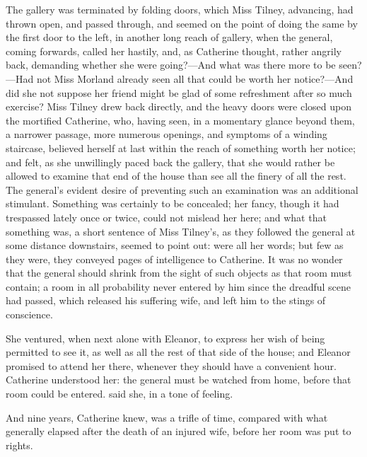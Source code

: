 The gallery was terminated by folding doors, which Miss Tilney, advancing, had thrown open, and passed through, and seemed on the point of doing the same by the first door to the left, in another long reach of gallery, when the general, coming forwards, called her hastily, and, as Catherine thought, rather angrily back, demanding whether she were going?---And what was there more to be seen?---Had not Miss Morland already seen all that could be worth her notice?---And did she not suppose her friend might be glad of some refreshment after so much exercise? Miss Tilney drew back directly, and the heavy doors were closed upon the mortified Catherine, who, having seen, in a momentary glance beyond them, a narrower passage, more numerous openings, and symptoms of a winding staircase, believed herself at last within the reach of something worth her notice; and felt, as she unwillingly paced back the gallery, that she would rather be allowed to examine that end of the house than see all the finery of all the rest. The general's evident desire of preventing such an examination was an additional stimulant. Something was certainly to be concealed; her fancy, though it had trespassed lately once or twice, could not mislead her here; and what that something was, a short sentence of Miss Tilney's, as they followed the general at some distance downstairs, seemed to point out:  were all her words; but few as they were, they conveyed pages of intelligence to Catherine. It was no wonder that the general should shrink from the sight of such objects as that room must contain; a room in all probability never entered by him since the dreadful scene had passed, which released his suffering wife, and left him to the stings of conscience.

She ventured, when next alone with Eleanor, to express her wish of being permitted to see it, as well as all the rest of that side of the house; and Eleanor promised to attend her there, whenever they should have a convenient hour. Catherine understood her: the general must be watched from home, before that room could be entered.  said she, in a tone of feeling.



 And nine years, Catherine knew, was a trifle of time, compared with what generally elapsed after the death of an injured wife, before her room was put to rights.

